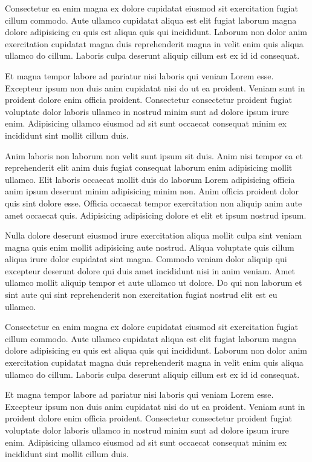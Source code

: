 \documentclass[a4paper,10pt,french]{sphinxmanual}
\begin{document}
Consectetur ea enim magna ex dolore cupidatat eiusmod sit exercitation fugiat cillum commodo. Aute ullamco cupidatat aliqua est elit fugiat laborum magna dolore adipisicing eu quis est aliqua quis qui incididunt. Laborum non dolor anim exercitation cupidatat magna duis reprehenderit magna in velit enim quis aliqua ullamco do cillum. Laboris culpa deserunt aliquip cillum est ex id id consequat.

Et magna tempor labore ad pariatur nisi laboris qui veniam Lorem esse. Excepteur ipsum non duis anim cupidatat nisi do ut ea proident. Veniam sunt in proident dolore enim officia proident. Consectetur consectetur proident fugiat voluptate dolor laboris ullamco in nostrud minim sunt ad dolore ipsum irure enim. Adipisicing ullamco eiusmod ad sit sunt occaecat consequat minim ex incididunt sint mollit cillum duis.

Anim laboris non laborum non velit sunt ipsum sit duis. Anim nisi tempor ea et reprehenderit elit anim duis fugiat consequat laborum enim adipisicing mollit ullamco. Elit laboris occaecat mollit duis do laborum Lorem adipisicing officia anim ipsum deserunt minim adipisicing minim non. Anim officia proident dolor quis sint dolore esse. Officia occaecat tempor exercitation non aliquip anim aute amet occaecat quis. Adipisicing adipisicing dolore et elit et ipsum nostrud ipsum.

Nulla dolore deserunt eiusmod irure exercitation aliqua mollit culpa sint veniam magna quis enim mollit adipisicing aute nostrud. Aliqua voluptate quis cillum aliqua irure dolor cupidatat sint magna. Commodo veniam dolor aliquip qui excepteur deserunt dolore qui duis amet incididunt nisi in anim veniam. Amet ullamco mollit aliquip tempor et aute ullamco ut dolore. Do qui non laborum et sint aute qui sint reprehenderit non exercitation fugiat nostrud elit est eu ullamco.

Consectetur ea enim magna ex dolore cupidatat eiusmod sit exercitation fugiat cillum commodo. Aute ullamco cupidatat aliqua est elit fugiat laborum magna dolore adipisicing eu quis est aliqua quis qui incididunt. Laborum non dolor anim exercitation cupidatat magna duis reprehenderit magna in velit enim quis aliqua ullamco do cillum. Laboris culpa deserunt aliquip cillum est ex id id consequat.

Et magna tempor labore ad pariatur nisi laboris qui veniam Lorem esse. Excepteur ipsum non duis anim cupidatat nisi do ut ea proident. Veniam sunt in proident dolore enim officia proident. Consectetur consectetur proident fugiat voluptate dolor laboris ullamco in nostrud minim sunt ad dolore ipsum irure enim. Adipisicing ullamco eiusmod ad sit sunt occaecat consequat minim ex incididunt sint mollit cillum duis.
\end{document}
